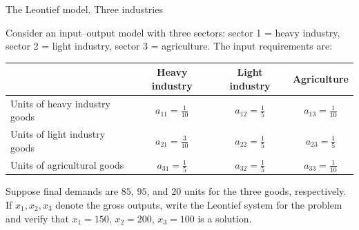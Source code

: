 \documentclass[9pt]{beamer}
\begin{document}
\begin{frame}{The Leontief model. Three industries}

Consider an input--output model with three sectors: 
sector 1 = heavy industry, sector 2 = light industry, sector 3 = agriculture. 
The input requirements are:

\medskip
{
\centering
\begin{tabular}{l|ccc}
 & Heavy industry & Light industry & Agriculture\\ \hline
Units of heavy industry goods & $a_{11}=\tfrac{1}{10}$ & $a_{12}=\tfrac{1}{5}$ & $a_{13}=\tfrac{1}{10}$\\
Units of light industry goods  & $a_{21}=\tfrac{3}{10}$ & $a_{22}=\tfrac{1}{5}$ & $a_{23}=\tfrac{1}{5}$\\
Units of agricultural goods    & $a_{31}=\tfrac{1}{5}$ & $a_{32}=\tfrac{1}{5}$ & $a_{33}=\tfrac{1}{10}$\\
\end{tabular}
}

\medskip
Suppose final demands are $85$, $95$, and $20$ units for the three goods, respectively.
If $x_1,x_2,x_3$ denote the gross outputs, write the Leontief system for the problem and
verify that $x_1=150$, $x_2=200$, $x_3=100$ is a solution.
\end{frame}
\end{document}
